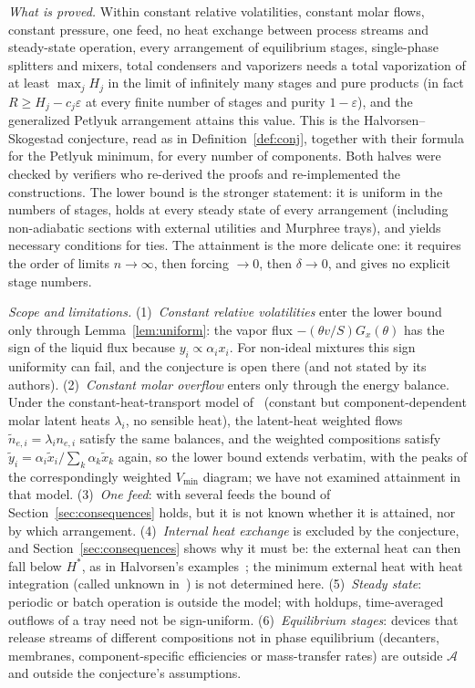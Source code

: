 \documentclass[11pt,a4paper]{report}
\newcommand{\cA}{\mathcal A}
\newcommand{\Hs}{H^{*}}
\begin{document}
\emph{What is proved.} Within constant relative volatilities, constant molar flows, constant pressure, one feed, no heat
exchange between process streams and steady-state operation, every arrangement of equilibrium stages, single-phase
splitters and mixers, total condensers and vaporizers needs a total vaporization of at least \(\max_jH_j\) in the limit of
infinitely many stages and pure products (in fact \(R\ge H_j-c_j\varepsilon\) at every finite number of stages and purity
\(1-\varepsilon\)), and the generalized Petlyuk arrangement attains this value. This is the Halvorsen--Skogestad conjecture, read
as in Definition~\ref{def:conj}, together with their formula for the Petlyuk minimum, for every number of components. Both
halves were checked by verifiers who re-derived the proofs and re-implemented the constructions. The
lower bound is the stronger statement: it is uniform in the numbers of stages, holds at every steady state of every
arrangement (including non-adiabatic sections with external utilities and Murphree trays), and yields necessary conditions
for ties. The attainment is the more delicate one: it requires the order of limits \(n\to\infty\), then forcing \(\to0\), then
\(\delta\to0\), and gives no explicit stage numbers.

\emph{Scope and limitations.} (1)~\emph{Constant relative volatilities} enter the lower bound only through
Lemma~\ref{lem:uniform}: the vapor flux \(-(\theta v/S)G_x(\theta)\) has the sign of the liquid flux because \(y_i\propto\alpha_ix_i\).
For non-ideal mixtures this sign uniformity can fail, and the conjecture is open there (and not stated by its authors).
(2)~\emph{Constant molar overflow} enters only through the energy balance. Under the constant-heat-transport model
of~\autocite{MTA2023} (constant but component-dependent molar latent heats \(\lambda_i\), no sensible heat), the latent-heat
weighted flows \(\tilde n_{e,i}=\lambda_in_{e,i}\) satisfy the same balances, and the weighted compositions satisfy
\(\tilde y_i=\alpha_i\tilde x_i/\sum_k\alpha_k\tilde x_k\) again, so the lower bound extends verbatim, with the peaks of the
correspondingly weighted \(V_{\min}\) diagram; we have not examined attainment in that model. (3)~\emph{One feed}: with several
feeds the bound of Section~\ref{sec:consequences} holds, but it is not known whether it is attained, nor by which arrangement.
(4)~\emph{Internal heat exchange} is excluded by the conjecture, and Section~\ref{sec:consequences} shows why it must be: the
external heat can then fall below \(\Hs\), as in Halvorsen's examples~\autocite[Table~6.1]{HalvorsenThesis}; the minimum
external heat with heat integration (called unknown in~\autocite{HS02}) is not determined here. (5)~\emph{Steady state}:
periodic or batch operation is outside the model; with holdups, time-averaged outflows of a tray need not be
sign-uniform. (6)~\emph{Equilibrium stages}: devices that release streams of different compositions not in phase
equilibrium (decanters, membranes, component-specific efficiencies or mass-transfer rates) are outside \(\cA\) and outside the
conjecture's assumptions.
\end{document}
